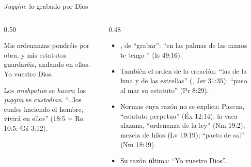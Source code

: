 \begin{frame}{\emph{Juqqim}: lo grabado por Dios}
\begin{columns}[c,onlytextwidth]
\begin{column}{0.50\textwidth}
\begin{cita}Mis ordenanzas pondréis por obra, y mis estatutos guardaréis, andando en ellos. Yo \SENOR{} vuestro Dios.\end{cita}
\begin{center}\small{}\end{center}
\scriptsize Los \emph{mishpatim} se \emph{hacen}; los \emph{juqqim} se \emph{custodian}. ``\ldots{}los cuales haciendo el hombre, vivirá en ellos'' (18:5 = Ro 10:5; Gá 3:12).
\end{column}
\begin{column}{0.48\textwidth}\scriptsize
\begin{itemize}
\item {}, de  ``grabar'': ``en las palmas de las manos te tengo '' (Is 49:16).
\item También el orden de la creación: ``las  de la luna y de las estrellas'' (, Jer 31:35); ``puso al mar su estatuto'' (Pr 8:29).
\item Normas cuya razón no se explica: Pascua, ``estatuto perpetuo'' (Éx 12:14); la vaca alazana, ``ordenanza de la ley'' (Nm 19:2); mezcla de hilos (Lv 19:19); ``pacto de sal'' (Nm 18:19).
\item Su razón última: ``Yo \SENOR{} vuestro Dios''.
\end{itemize}
\end{column}
\end{columns}
\end{frame}

